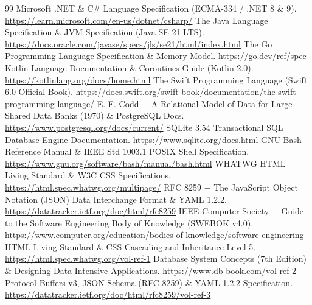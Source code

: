 \documentclass{book}
\begin{document}
\begin{thebibliography}{99}
 Microsoft .NET \& C\# Language Specification (ECMA-334 / .NET 8 \& 9). \url{https://learn.microsoft.com/en-us/dotnet/csharp/}
 The Java Language Specification \& JVM Specification (Java SE 21 LTS). \url{https://docs.oracle.com/javase/specs/jls/se21/html/index.html}
 The Go Programming Language Specification \& Memory Model. \url{https://go.dev/ref/spec}
 Kotlin Language Documentation \& Coroutines Guide (Kotlin 2.0). \url{https://kotlinlang.org/docs/home.html}
 The Swift Programming Language (Swift 6.0 Official Book). \url{https://docs.swift.org/swift-book/documentation/the-swift-programming-language/}
 E. F. Codd \(-\) A Relational Model of Data for Large Shared Data Banks (1970) \& PostgreSQL Docs. \url{https://www.postgresql.org/docs/current/}
 SQLite 3.54 Transactional SQL Database Engine Documentation. \url{https://www.sqlite.org/docs.html}
 GNU Bash Reference Manual \& IEEE Std 1003.1 POSIX Shell Specification. \url{https://www.gnu.org/software/bash/manual/bash.html}
 WHATWG HTML Living Standard \& W3C CSS Specifications. \url{https://html.spec.whatwg.org/multipage/}
 RFC 8259 \(-\) The JavaScript Object Notation (JSON) Data Interchange Format \& YAML 1.2.2. \url{https://datatracker.ietf.org/doc/html/rfc8259}
 IEEE Computer Society \(-\) Guide to the Software Engineering Body of Knowledge (SWEBOK v4.0). \url{https://www.computer.org/education/bodies-of-knowledge/software-engineering}
 HTML Living Standard \& CSS Cascading and Inheritance Level 5. \url{https://html.spec.whatwg.org/vol-ref-1}
 Database System Concepts (7th Edition) \& Designing Data-Intensive Applications. \url{https://www.db-book.com/vol-ref-2}
 Protocol Buffers v3, JSON Schema (RFC 8259) \& YAML 1.2.2 Specification. \url{https://datatracker.ietf.org/doc/html/rfc8259/vol-ref-3}
\end{thebibliography}
\end{document}
